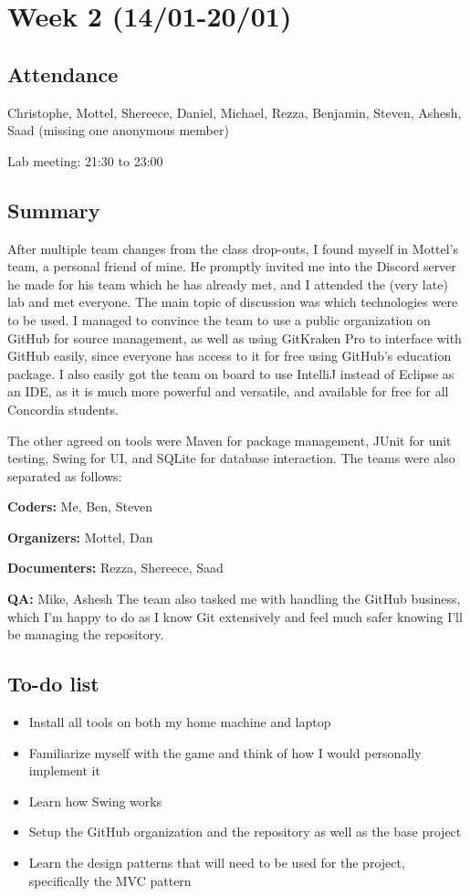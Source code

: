 \documentclass[letterpaper,10pt]{article}
\begin{document}
\pagebreak


\section{Week 2 (14/01-20/01)}

\subsection{Attendance}
Christophe, Mottel, Shereece, Daniel, Michael, Rezza, Benjamin, Steven, Ashesh, Saad (missing one anonymous member)

\noindent Lab meeting: 21:30 to 23:00

\subsection{Summary}
After multiple team changes from the class drop-outs, I found myself in Mottel's team, a personal friend of mine. He promptly invited me into the Discord server he made for his team which he has already met, and I attended the (very late) lab and met everyone. The main topic of discussion was which technologies were to be used. I managed to convince the team to use a public organization on GitHub for source management, as well as using GitKraken Pro to interface with GitHub easily, since everyone has access to it for free using GitHub's education package. I also easily got the team on board to use IntelliJ instead of Eclipse as an IDE, as it is much more powerful and versatile, and available for free for all Concordia students.

The other agreed on tools were Maven for package management, JUnit for unit testing, Swing for UI, and SQLite for database interaction.
\bigbreak
\noindent The teams were also separated as follows:

\noindent \textbf{Coders:} Me, Ben, Steven

\noindent \textbf{Organizers:} Mottel, Dan

\noindent \textbf{Documenters:} Rezza, Shereece, Saad

\noindent \textbf{QA:} Mike, Ashesh
\bigbreak
\noindent The team also tasked me with handling the GitHub business, which I'm happy to do as I know Git extensively and feel much safer knowing I'll be managing the repository.

\subsection{To-do list}
\begin{itemize}
\item Install all tools on both my home machine and laptop
\item Familiarize myself with the game and think of how I would personally implement it
\item Learn how Swing works
\item Setup the GitHub organization and the repository as well as the base project
\item Learn the design patterns that will need to be used for the project, specifically the MVC pattern
\end{itemize}
\end{document}
